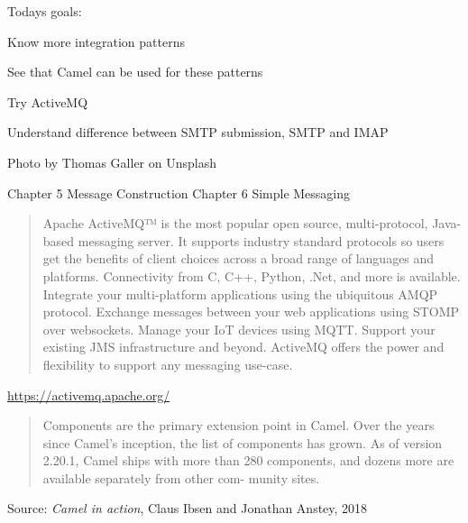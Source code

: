 \documentclass[Screen16to9,17pt]{foils}
\begin{document}


Todays goals:
\begin{list2}
\item Know more integration patterns
\item See that Camel can be used for these patterns
\item Try ActiveMQ
\item Understand difference between SMTP submission, SMTP and IMAP
\end{list2}

Photo by Thomas Galler on Unsplash



Chapter 5 Message Construction Chapter 6 Simple Messaging




\begin{quote}
Apache ActiveMQ™ is the most popular open source, multi-protocol, Java-based messaging server. It supports industry standard protocols so users get the benefits of client choices across a broad range of languages and platforms. Connectivity from C, C++, Python, .Net, and more is available. Integrate your multi-platform applications using the ubiquitous AMQP protocol. Exchange messages between your web applications using STOMP over websockets. Manage your IoT devices using MQTT. Support your existing JMS infrastructure and beyond. ActiveMQ offers the power and flexibility to support any messaging use-case.
\end{quote}

\url{https://activemq.apache.org/}







\begin{quote}
Components are the primary extension point in Camel. Over the years since Camel’s
inception, the list of components has grown. As of version 2.20.1, Camel ships with
more than 280 components, and dozens more are available separately from other com-
munity sites.
\end{quote}
Source: \emph{Camel in action}, Claus Ibsen and Jonathan Anstey, 2018
\end{document}

